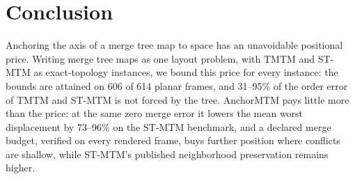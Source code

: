 \section{Conclusion}
Anchoring the axis of a merge tree map to space has an unavoidable positional price. Writing merge tree maps as one layout problem, with TMTM and ST-MTM as exact-topology instances, we bound this price for every instance: the bounds are attained on 606 of 614 planar frames, and 31--95\% of the order error of TMTM and ST-MTM is not forced by the tree. AnchorMTM pays little more than the price: at the same zero merge error it lowers the mean worst displacement by 73--96\% on the ST-MTM benchmark, and a declared merge budget, verified on every rendered frame, buys further position where conflicts are shallow, while ST-MTM's published neighborhood preservation remains higher.
